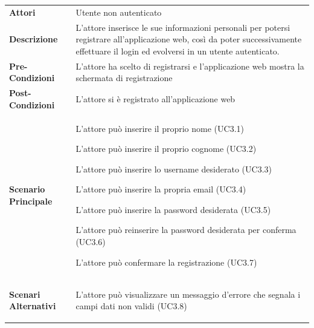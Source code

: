 \begin{longtable}{ l | p{11cm}}
	\hline
	\rowcolor{Gray}
	 \multicolumn{2}{c}{UC3 - Registrazione utente} \\
	 \hline
	\textbf{Attori} & Utente non autenticato \\
	\textbf{Descrizione} & L'attore inserisce le sue informazioni personali per potersi registrare all'applicazione web, così da poter successivamente effettuare il login ed evolversi in un utente autenticato. \\
	\textbf{Pre-Condizioni} & L'attore ha scelto di registrarsi e l'applicazione web mostra la schermata di registrazione \\
	\textbf{Post-Condizioni} & L'attore si è registrato all'applicazione web \\
	\textbf{Scenario Principale} & \begin{enumerate*}[label=(\arabic*.),itemjoin={\newline}]
		\item L'attore può inserire il proprio nome (UC3.1)
		\item L'attore può inserire il proprio cognome (UC3.2)
		\item L'attore può inserire lo username desiderato (UC3.3)
		\item L'attore può inserire la propria email (UC3.4) 
		\item L'attore può inserire la password desiderata (UC3.5)
		\item L'attore può reinserire la password desiderata per conferma (UC3.6)
		\item L'attore può confermare la registrazione (UC3.7)
	\end{enumerate*}\\
	\textbf{Scenari Alternativi} & 
	\begin{enumerate*}[label=(\arabic*.),itemjoin={\newline}]
		\item L'attore può visualizzare un messaggio d'errore che segnala i campi dati non validi (UC3.8)
	\end{enumerate*}\\
\end{longtable}